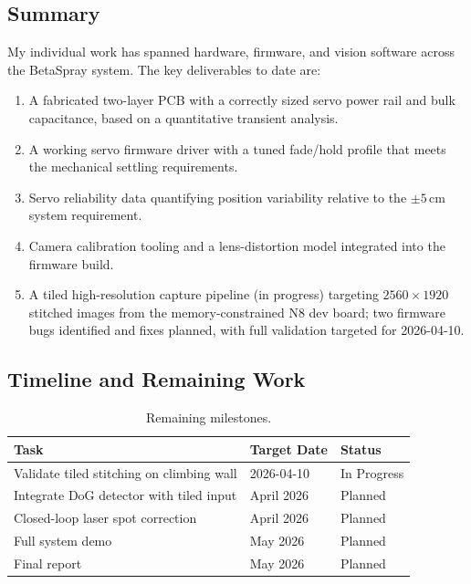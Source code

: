 \documentclass[12pt]{article}
\begin{document}
\subsection{Summary}

My individual work has spanned hardware, firmware, and vision software across
the BetaSpray system.  The key deliverables to date are:

\begin{enumerate}
  \item A fabricated two-layer PCB with a correctly sized servo power rail and
        bulk capacitance, based on a quantitative transient analysis.
  \item A working servo firmware driver with a tuned fade/hold profile that
        meets the mechanical settling requirements.
  \item Servo reliability data quantifying position variability relative to the
        $\pm 5$\,cm system requirement.
  \item Camera calibration tooling and a lens-distortion model integrated into
        the firmware build.
  \item A tiled high-resolution capture pipeline (in progress) targeting
        $2560\times1920$ stitched images from the memory-constrained N8 dev
        board; two firmware bugs identified and fixes planned, with full
        validation targeted for 2026-04-10.
\end{enumerate}

\subsection{Timeline and Remaining Work}

\begin{table}[H]
  \centering
  \caption{Remaining milestones.}
  \label{tab:timeline}
  \begin{tabular}{lll}
    \toprule
    Task & Target Date & Status \\
    \midrule
    Validate tiled stitching on climbing wall & 2026-04-10 & In Progress \\
    Integrate DoG detector with tiled input & April 2026 & Planned \\
    Closed-loop laser spot correction & April 2026 & Planned \\
    Full system demo & May 2026 & Planned \\
    Final report & May 2026 & Planned \\
    \bottomrule
  \end{tabular}
\end{table}
\end{document}
